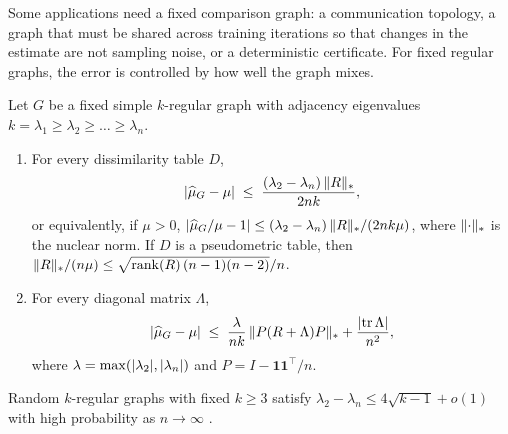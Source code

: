 \documentclass[twoside,11pt]{article}
\DeclarePairedDelimiter{\abs}{\lvert}{\rvert}
\DeclarePairedDelimiter{\norm}{\lVert}{\rVert}
\newcommand{\SND}{\mu}
\newcommand{\SNDG}{\widehat{\mu}_{G}}
\newcommand{\one}{\mathbf{1}}
\begin{document}
Some applications need a fixed comparison graph: a communication topology,
a graph that must be shared across training iterations so that changes in
the estimate are not sampling noise, or a deterministic certificate. For
fixed regular graphs, the error is controlled by how well the graph mixes.

\begin{theorem}
\label{thm:fixed-spectral}
Let $G$ be a fixed simple $k$-regular graph with adjacency eigenvalues
$k=\lambda_1\ge\lambda_2\ge\dots\ge\lambda_n$.
\begin{enumerate}
\item[(i)] For every dissimilarity table $D$,
\[
\abs{\SNDG-\SND}\;\le\;\frac{(\lambda_2-\lambda_n)\,\norm{R}_*}{2nk},
\]
or equivalently, if $\mu>0$,
$\abs{\SNDG/\SND-1}\le(\lambda_2-\lambda_n)\,\norm{R}_*/(2nk\mu)$,
where $\norm{\cdot}_*$ is the nuclear norm. If $D$ is a pseudometric table,
then $\norm{R}_*/(n\mu)\le\sqrt{\operatorname{rank}(R)\,(n-1)(n-2)}/n$.
\item[(ii)] For every diagonal matrix $\Lambda$,
\[
\abs{\SNDG-\SND}\;\le\;\frac{\lambda}{nk}\,\norm{P(R+\Lambda)P}_*+\frac{\abs{\operatorname{tr}\Lambda}}{n^2},
\]
where $\lambda=\max(\abs{\lambda_2},\abs{\lambda_n})$ and $P=I-\one\one^\top/n$.
\end{enumerate}
Random $k$-regular graphs with fixed $k\ge3$ satisfy $\lambda_2-\lambda_n\le
4\sqrt{k-1}+o(1)$ with high probability as $n\to\infty$
\citep{friedman2008proof,bordenave2020new}.
\end{theorem}
\end{document}
